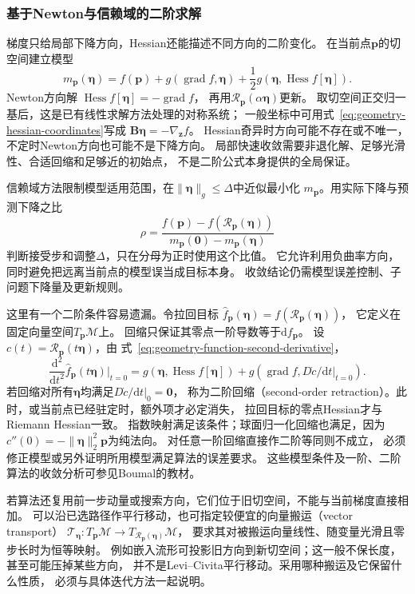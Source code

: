 \subsubsection{基于Newton与信赖域的二阶求解}
\label{sec:geometry-riemannian-newton-trust-region}

梯度只给局部下降方向，Hessian还能描述不同方向的二阶变化。
在当前点$\bm p$的切空间建立模型
\[
 m_{\bm p}(\bm\eta)=f(\bm p)
  +g(\operatorname{grad}f,\bm\eta)
  +\frac12g(\bm\eta,\operatorname{Hess}f[\bm\eta]).
\]
Newton方向解
$\operatorname{Hess}f[\bm\eta]=-\operatorname{grad}f$，
再用$\mathcal R_{\bm p}(\alpha\bm\eta)$更新。
取切空间正交归一基后，这是已有线性求解方法处理的对称系统；
一般坐标中可用式~\eqref{eq:geometry-hessian-coordinates}写成
$\bm B\bm\eta=-\nabla_{\bm z}f$。
Hessian奇异时方向可能不存在或不唯一，不定时Newton方向也可能不是下降方向。
局部快速收敛需要非退化解、足够光滑性、合适回缩和足够近的初始点，
不是二阶公式本身提供的全局保证。

信赖域方法限制模型适用范围，在$\lVert\bm\eta\rVert_g\leq\Delta$中近似最小化
$m_{\bm p}$。用实际下降与预测下降之比
\[
 \rho=\frac{f(\bm p)-f(\mathcal R_{\bm p}(\bm\eta))}
             {m_{\bm p}(\bm0)-m_{\bm p}(\bm\eta)}
\]
判断接受步和调整$\Delta$，只在分母为正时使用这个比值。
它允许利用负曲率方向，同时避免把远离当前点的模型误当成目标本身。
收敛结论仍需模型误差控制、子问题下降量及更新规则。

这里有一个二阶条件容易遗漏。令拉回目标
$\widehat f_{\bm p}(\bm\eta)=f(\mathcal R_{\bm p}(\bm\eta))$，
它定义在固定向量空间$T_{\bm p}\mathcal M$上。
回缩只保证其零点一阶导数等于$\mathrm df_{\bm p}$。
设$c(t)=\mathcal R_{\bm p}(t\bm\eta)$，由
式~\eqref{eq:geometry-function-second-derivative}，
\begin{equation}
 \frac{\mathrm d^2}{\mathrm dt^2}\widehat f_{\bm p}(t\bm\eta)
 \bigg|_{t=0}
 =g(\bm\eta,\operatorname{Hess}f[\bm\eta])
  +g(\operatorname{grad}f,D\dot c/\mathrm dt|_{t=0}).
 \label{eq:geometry-retraction-pullback-hessian}
\end{equation}
若回缩对所有$\bm\eta$均满足$D\dot c/\mathrm dt|_0=\bm0$，
称为二阶回缩（second-order retraction）。此时，或当前点已经驻定时，额外项才必定消失，
拉回目标的零点Hessian才与Riemann Hessian一致。
指数映射满足该条件；球面归一化回缩也满足，因为
$c''(0)=-\lVert\bm\eta\rVert_2^2\bm p$为纯法向。
对任意一阶回缩直接作二阶等同则不成立，
必须修正模型或另外证明所用模型满足算法的误差要求。
这些模型条件及一阶、二阶算法的收敛分析可参见Boumal的教材。

若算法还复用前一步动量或搜索方向，它们位于旧切空间，不能与当前梯度直接相加。
可以沿已选路径作平行移动，也可指定较便宜的向量搬运（vector transport）
$\mathcal T_{\bm\eta}:T_{\bm p}\mathcal M\to
T_{\mathcal R_{\bm p}(\bm\eta)}\mathcal M$，
要求其对被搬运向量线性、随变量光滑且零步长时为恒等映射。
例如嵌入流形可投影旧方向到新切空间；这一般不保长度，甚至可能压掉某些方向，
并不是Levi--Civita平行移动。采用哪种搬运及它保留什么性质，
必须与具体迭代方法一起说明。


